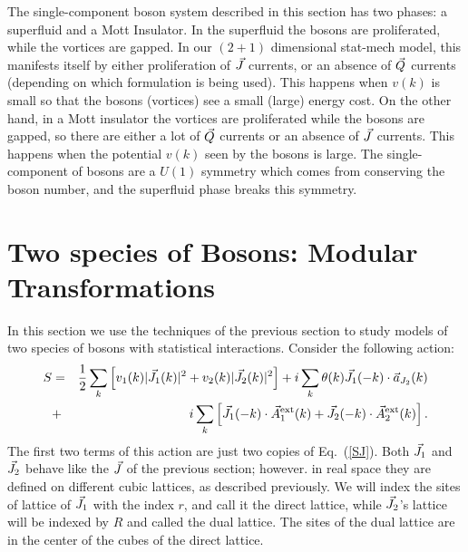 The single-component boson system described in this section has two phases: a superfluid and a Mott Insulator. In the superfluid the bosons are proliferated, while the vortices are gapped. In our $(2+1)$ dimensional stat-mech model, this manifests itself by either proliferation of $\vec{J}$ currents, or an absence of $\vec{Q}$ currents (depending on which formulation is being used). This happens when $v(k)$ is small so that the bosons (vortices) see a small (large) energy cost. On the other hand, in a Mott insulator the vortices are proliferated while the bosons are gapped, so there are either a lot of $\vec{Q}$ currents or an absence of $\vec{J}$ currents. This happens when the potential $v(k)$ seen by the bosons is large. The single-component of bosons are a $U(1)$ symmetry which comes from conserving the boson number, and the superfluid phase breaks this symmetry.

\section{Two species of Bosons: Modular Transformations}
\label{section::modular}
In this section we use the techniques of the previous section to study models of two species of bosons with statistical interactions.\cite{short_range3,Gen2Loops,FQHE} Consider the following action:
\begin{eqnarray}
S&=&\frac{1}{2}\sum_k \left[v_1(k)|\vec{J}_1(k)|^2+v_2(k)|\vec{J}_2(k)|^2\right]
+i\sum_k \theta(k)\vec{J}_1(-k)\cdot \vec{a}_{J_2}(k)\nonumber\\
&+&i\sum_k \left[ \vec{J}_1(-k)\cdot \vec{A}_{1}^{\rm ext}(k) + \vec{J}_2(-k)\cdot \vec{A}_{2}^{\rm ext}(k) \right].
\label{kaction_1}
\end{eqnarray}
The first two terms of this action are just two copies of Eq.~(\ref{SJ}). Both $\vec{J}_1$ and $\vec{J}_2$ behave like the $\vec{J}$ of the previous section; however. in real space they are defined on different cubic lattices, as described previously. We will index the sites of lattice of $\vec{J}_1$ with the index $r$, and call it the direct lattice, while $\vec{J}_2$'s lattice will be indexed by $R$ and called the dual lattice. The sites of the dual lattice are in the center of the cubes of the direct lattice.

